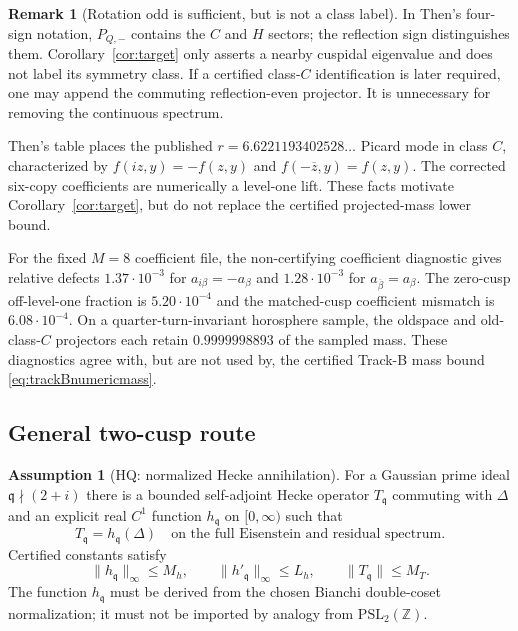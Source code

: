 \documentclass[11pt]{amsart}
\theoremstyle{definition}
\newtheorem{assumption}[theorem]{Assumption}
\newtheorem{remark}[theorem]{Remark}
\newcommand{\ZZ}{\mathbb Z}
\newcommand{\norm}[1]{\lVert #1\rVert}
\newcommand{\D}{\Delta}
\begin{document}
\begin{remark}[Rotation odd is sufficient, but is not a class label]
In Then's four-sign notation, $P_{Q,-}$ contains the $C$ and $H$ sectors;
the reflection sign distinguishes them. Corollary~\ref{cor:target} only
asserts a nearby cuspidal eigenvalue and does not label its symmetry class.
If a certified class-$C$ identification is later required, one may append
the commuting reflection-even projector. It is unnecessary for removing the
continuous spectrum.
\end{remark}

Then's table places the published
$r=6.6221193402528\ldots$ Picard mode in class $C$, characterized by
$f(iz,y)=-f(z,y)$ and $f(-\overline z,y)=f(z,y)$. The corrected six-copy
coefficients are numerically a level-one lift.
These facts motivate Corollary~\ref{cor:target}, but do not replace the
certified projected-mass lower bound.

For the fixed $M=8$ coefficient file, the non-certifying coefficient
diagnostic gives relative defects $1.37\cdot10^{-3}$ for
$a_{i\beta}=-a_\beta$ and $1.28\cdot10^{-3}$ for
$a_{\overline\beta}=a_\beta$. The zero-cusp off-level-one fraction is
$5.20\cdot10^{-4}$ and the matched-cusp coefficient mismatch is
$6.08\cdot10^{-4}$. On a quarter-turn-invariant horosphere sample, the
oldspace and old-class-$C$ projectors each retain $0.9999998893$ of the
sampled mass. These diagnostics agree with, but are not used by, the
certified Track-B mass bound \eqref{eq:trackBnumericmass}.

\subsection{General two-cusp route}

\begin{assumption}[HQ: normalized Hecke annihilation]\label{ass:HQ}
For a Gaussian prime ideal $\mathfrak q\nmid(2+i)$ there is a bounded
self-adjoint Hecke operator $T_{\mathfrak q}$ commuting with $\D$ and an
explicit real $C^1$ function $h_{\mathfrak q}$ on $[0,\infty)$ such that
\[
 T_{\mathfrak q}=h_{\mathfrak q}(\D)
\quad\text{on the full Eisenstein and residual spectrum.}
\]
Certified constants satisfy
\[
 \norm{h_{\mathfrak q}}_\infty\le M_h,\qquad
 \norm{h'_{\mathfrak q}}_\infty\le L_h,\qquad
 \norm{T_{\mathfrak q}}\le M_T.
\]
The function $h_{\mathfrak q}$ must be derived from the chosen Bianchi
double-coset normalization; it must not be imported by analogy from
$\mathrm{PSL}_2(\ZZ)$.
\end{assumption}
\end{document}
